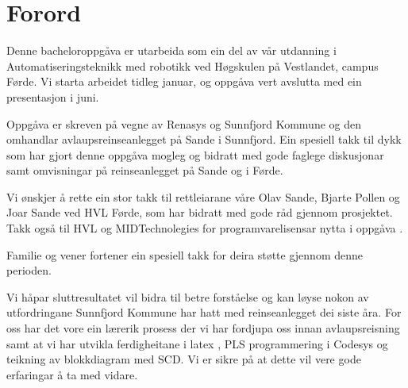 \chapter{Forord}
\thispagestyle{romanpages}

Denne bacheloroppgåva er utarbeida som ein del av vår utdanning i Automatiseringsteknikk med robotikk ved Høgskulen på Vestlandet, campus Førde.
Vi starta arbeidet tidleg januar, og oppgåva vert avslutta med ein presentasjon i juni.

Oppgåva er skreven på vegne av \gls{Renasys} \citep{Renasys} og \gls{Sunnfjord Kommune} \citep{SunnfjordKommune} og den omhandlar 
avlaupsreinseanlegget på Sande i Sunnfjord. 
Ein spesiell takk til dykk som har gjort denne oppgåva mogleg og
bidratt med gode faglege diskusjonar samt omvisningar på reinseanlegget på Sande og i Førde.

Vi ønskjer å rette ein stor takk til rettleiarane våre Olav Sande, Bjarte Pollen og Joar Sande ved \gls{HVL} Førde, som har bidratt med gode råd gjennom prosjektet.
Takk også til \gls{HVL} \citep{HVL} og MIDTechnolegies \citep{MIDT} for programvarelisensar nytta i oppgåva \citep{MIDTToolbox} \citep{Microsoft}.

Familie og vener fortener ein spesiell takk for deira støtte gjennom denne perioden.

Vi håpar sluttresultatet vil bidra til betre forståelse og kan løyse nokon av utfordringane \gls{Sunnfjord Kommune} har hatt med reinseanlegget dei siste åra.
For oss har det vore ein lærerik prosess der vi har fordjupa oss innan avlaupsreisning samt at vi har utvikla ferdigheitane i \gls{latex} \citep{MikTeX} \citep{VisualStudio}, 
\gls{PLS} programmering i \gls{Codesys} \citep{Codesys} og teikning av blokkdiagram med \gls{SCD}. Vi er sikre på at dette vil vere gode erfaringar å ta med vidare.
 